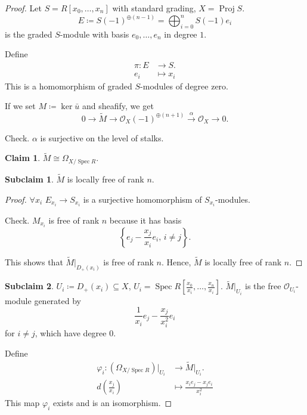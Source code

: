 \documentclass[12pt]{article}
\DeclareMathOperator{\Spec}{Spec}
\DeclareMathOperator{\Proj}{Proj}
\theoremstyle{definition}
\newtheorem*{claim}{Claim}
\newtheorem{subclaim}{Subclaim}
\theoremstyle{remark}
\begin{document}
\begin{proof}
Let $S=R[x_0,\ldots,x_n]$ with standard grading, $X=\Proj S$.
\[E\coloneqq S(-1)^{\oplus(n-1)}=\bigoplus_{i=0}^nS(-1)e_i\]
is the graded $S$-module with basis $e_0,\ldots,e_n$ in degree $1$.

Define
\begin{align*}
\pi:E&\longrightarrow S.\\
e_i&\longmapsto x_i
\end{align*}
This is a homomorphism of graded $S$-modules of degree zero.

If we set $M\coloneqq\ker\bar{u}$ and sheafify, we get
\[0\longrightarrow\widetilde{M}\longrightarrow\mathcal{O}_X(-1)^{\oplus(n+1)}\overset{\alpha}{\longrightarrow}\mathcal{O}_X\longrightarrow0.\]

Check. $\alpha$ is surjective on the level of stalks.

\begin{claim}
$\widetilde{M}\cong\Omega_{X/\Spec R}$.
\end{claim}

\begin{subclaim}
$\widetilde{M}$ is locally free of rank $n$.
\end{subclaim}

\begin{proof}
$\forall x_i$ $E_{x_i}\rightarrow S_{x_i}$ is a surjective homomorphism of $S_{x_i}$-modules.

Check. $M_{x_i}$ is free of rank $n$ because it has basis
\[\left\{e_j-\frac{x_j}{x_i}e_i,\,i\neq j\right\}.\]

This shows that $\widetilde{M}|_{D_+(x_i)}$ is free of rank $n$. Hence, $\widetilde{M}$ is locally free of rank $n$.
\end{proof}

\begin{subclaim}
$U_i\coloneqq D_+(x_i)\subseteq X$, $U_i=\Spec R[\frac{x_0}{x_i},\ldots,\frac{x_n}{x_i}]$. $\widetilde{M}|_{U_i}$ is the free $\mathcal{O}_{U_i}$-module generated by
\[\frac{1}{x_i}e_j-\frac{x_j}{x_i^2}e_i\]
for $i\neq j$, which have degree 0.
\end{subclaim}

Define
\begin{align*}
\varphi_i:(\Omega_{X/\Spec R})|_{U_i}&\longrightarrow\widetilde{M}|_{U_i}.\\
d\left(\frac{x_j}{x_i}\right)&\longmapsto\frac{x_ie_j-x_je_i}{x_i^2}
\end{align*}
This map $\varphi_i$ exists and is an isomorphism.


\end{proof}
\end{document}
